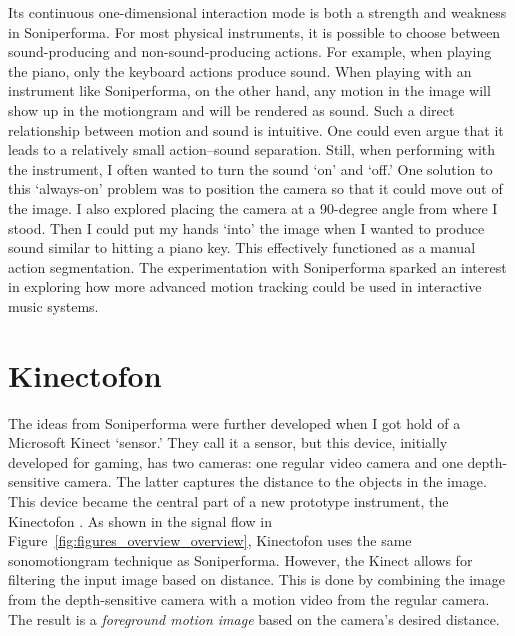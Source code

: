 Its continuous one-dimensional interaction mode is both a strength and weakness in Soniperforma. For most physical instruments, it is possible to choose between sound-producing and non-sound-producing actions. For example, when playing the piano, only the keyboard actions produce sound. When playing with an instrument like Soniperforma, on the other hand, any motion in the image will show up in the motiongram and will be rendered as sound. Such a direct relationship between motion and sound is intuitive. One could even argue that it leads to a relatively small action--sound separation. Still, when performing with the instrument, I often wanted to turn the sound `on' and `off.' One solution to this `always-on' problem was to position the camera so that it could move out of the image. I also explored placing the camera at a 90-degree angle from where I stood. Then I could put my hands `into' the image when I wanted to produce sound similar to hitting a piano key. This effectively functioned as a manual action segmentation. The experimentation with Soniperforma sparked an interest in exploring how more advanced motion tracking could be used in interactive music systems.


\section{Kinectofon}

The ideas from Soniperforma were further developed when I got hold of a Microsoft Kinect `sensor.' They call it a sensor, but this device, initially developed for gaming, has two cameras: one regular video camera and one depth-sensitive camera. The latter captures the distance to the objects in the image. This device became the central part of a new prototype instrument, the Kinectofon \citep{jensenius_kinectofon_2013}. As shown in the signal flow in Figure~\ref{fig:figures_overview_overview}, Kinectofon uses the same sonomotiongram technique as Soniperforma. However, the Kinect allows for filtering the input image based on distance. This is done by combining the image from the depth-sensitive camera with a motion video from the regular camera. The result is a \emph{foreground motion image} based on the camera's desired distance.

